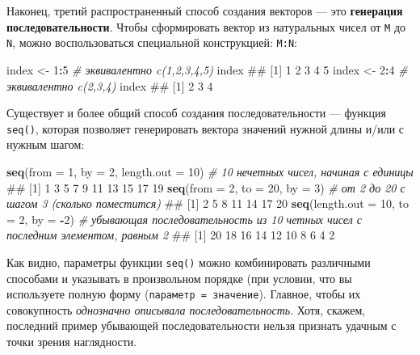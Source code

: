 \documentclass[]{book}
\newenvironment{Shaded}{\begin{snugshade}}{\end{snugshade}}
\newcommand{\KeywordTok}[1]{\textcolor[rgb]{0.13,0.29,0.53}{\textbf{#1}}}
\newcommand{\DataTypeTok}[1]{\textcolor[rgb]{0.13,0.29,0.53}{#1}}
\newcommand{\DecValTok}[1]{\textcolor[rgb]{0.00,0.00,0.81}{#1}}
\newcommand{\StringTok}[1]{\textcolor[rgb]{0.31,0.60,0.02}{#1}}
\newcommand{\CommentTok}[1]{\textcolor[rgb]{0.56,0.35,0.01}{\textit{#1}}}
\newcommand{\OperatorTok}[1]{\textcolor[rgb]{0.81,0.36,0.00}{\textbf{#1}}}
\newcommand{\NormalTok}[1]{#1}
\begin{document}
Наконец, третий распространенный способ создания векторов --- это
\textbf{генерация последовательности}. Чтобы сформировать вектор из
натуральных чисел от \texttt{M} до \texttt{N}, можно воспользоваться
специальной конструкцией: \texttt{M:N}:

\begin{Shaded}
\begin{Highlighting}[]
\NormalTok{index <-}\StringTok{ }\DecValTok{1}\OperatorTok{:}\DecValTok{5} \CommentTok{# эквивалентно c(1,2,3,4,5)}
\NormalTok{index}
\NormalTok{## [1] 1 2 3 4 5}
\NormalTok{index <-}\StringTok{ }\DecValTok{2}\OperatorTok{:}\DecValTok{4} \CommentTok{# эквивалентно c(2,3,4)}
\NormalTok{index}
\NormalTok{## [1] 2 3 4}
\end{Highlighting}
\end{Shaded}

Существует и более общий способ создания последовательности --- функция
\texttt{seq()}, которая позволяет генерировать вектора значений нужной
длины и/или с нужным шагом:

\begin{Shaded}
\begin{Highlighting}[]
\KeywordTok{seq}\NormalTok{(}\DataTypeTok{from =} \DecValTok{1}\NormalTok{, }\DataTypeTok{by =} \DecValTok{2}\NormalTok{, }\DataTypeTok{length.out =} \DecValTok{10}\NormalTok{) }\CommentTok{# 10 нечетных чисел, начиная с единицы}
\NormalTok{##  [1]  1  3  5  7  9 11 13 15 17 19}
\KeywordTok{seq}\NormalTok{(}\DataTypeTok{from =} \DecValTok{2}\NormalTok{, }\DataTypeTok{to =} \DecValTok{20}\NormalTok{, }\DataTypeTok{by =} \DecValTok{3}\NormalTok{) }\CommentTok{# от 2 до 20 с шагом 3 (сколько поместится)}
\NormalTok{## [1]  2  5  8 11 14 17 20}
\KeywordTok{seq}\NormalTok{(}\DataTypeTok{length.out =} \DecValTok{10}\NormalTok{, }\DataTypeTok{to =} \DecValTok{2}\NormalTok{, }\DataTypeTok{by =} \OperatorTok{-}\DecValTok{2}\NormalTok{) }\CommentTok{# убывающая последовательность из 10 четных чисел с последним элементом, равным 2}
\NormalTok{##  [1] 20 18 16 14 12 10  8  6  4  2}
\end{Highlighting}
\end{Shaded}

Как видно, параметры функции \texttt{seq()} можно комбинировать
различными способами и указывать в произвольном порядке (при условии,
что вы используете полную форму (\texttt{параметр\ =\ значение}).
Главное, чтобы их совокупность \emph{однозначно описывала
последовательность}. Хотя, скажем, последний пример убывающей
последовательности нельзя признать удачным с точки зрения наглядности.
\end{document}
